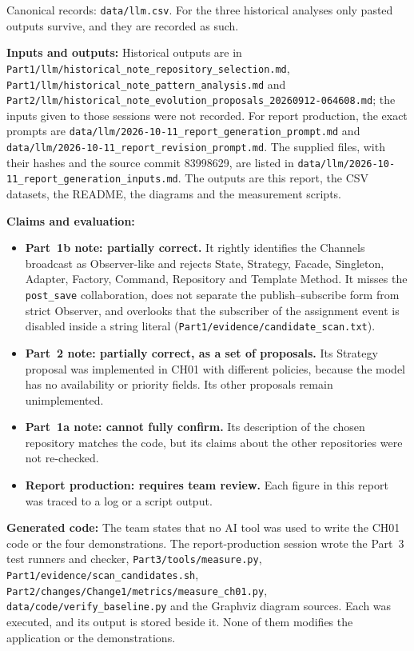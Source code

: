 \documentclass[11pt,a4paper]{article}
\newcommand{\entry}[1]{\par\textbf{#1:} }
\newcommand{\code}[1]{\nolinkurl{#1}}
\begin{document}
Canonical records: \code{data/llm.csv}. For the three historical analyses only pasted outputs survive, and they are recorded as such.

\entry{Inputs and outputs}Historical outputs are in \code{Part1/llm/historical_note_repository_selection.md}, \code{Part1/llm/historical_note_pattern_analysis.md} and \code{Part2/llm/historical_note_evolution_proposals_20260912-064608.md}; the inputs given to those sessions were not recorded. For report production, the exact prompts are \code{data/llm/2026-10-11_report_generation_prompt.md} and \code{data/llm/2026-10-11_report_revision_prompt.md}. The supplied files, with their hashes and the source commit 83998629, are listed in \code{data/llm/2026-10-11_report_generation_inputs.md}. The outputs are this report, the CSV datasets, the README, the diagrams and the measurement scripts.

\entry{Claims and evaluation}
\begin{itemize}
\item \textbf{Part~1b note: partially correct.} It rightly identifies the Channels broadcast as Observer-like and rejects State, Strategy, Facade, Singleton, Adapter, Factory, Command, Repository and Template Method. It misses the \code{post_save} collaboration, does not separate the publish--subscribe form from strict Observer, and overlooks that the subscriber of the assignment event is disabled inside a string literal (\code{Part1/evidence/candidate_scan.txt}).
\item \textbf{Part~2 note: partially correct, as a set of proposals.} Its Strategy proposal was implemented in CH01 with different policies, because the model has no availability or priority fields. Its other proposals remain unimplemented.
\item \textbf{Part~1a note: cannot fully confirm.} Its description of the chosen repository matches the code, but its claims about the other repositories were not re-checked.
\item \textbf{Report production: requires team review.} Each figure in this report was traced to a log or a script output.
\end{itemize}

\entry{Generated code}The team states that no AI tool was used to write the CH01 code or the four demonstrations. The report-production session wrote the Part~3 test runners and checker, \code{Part3/tools/measure.py}, \code{Part1/evidence/scan_candidates.sh}, \code{Part2/changes/Change1/metrics/measure_ch01.py}, \code{data/code/verify_baseline.py} and the Graphviz diagram sources. Each was executed, and its output is stored beside it. None of them modifies the application or the demonstrations.
\end{document}
